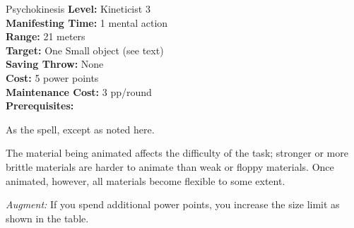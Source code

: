 {Psychokinesis}
{
	\textbf{Level:}
	Kineticist 3\\
	\textbf{Manifesting Time:}
	1 mental action\\
	\textbf{Range:}
	21 meters\\
	\textbf{Target:}
	One Small object (see text)\\
	\textbf{Saving Throw:}
	None\\
	\textbf{Cost:}
	5 power points\\
	\textbf{Maintenance Cost:}
	3 pp/round\\
	\textbf{Prerequisites:}
	\\
}
{
	As the  spell, except as noted here.

	The material being animated affects the difficulty of the task; stronger or more brittle materials are harder to animate than weak or floppy materials. Once animated, however, all materials become flexible to some extent.


	\textit{Augment:} If you spend additional power points, you increase the size limit as shown in the table.
}